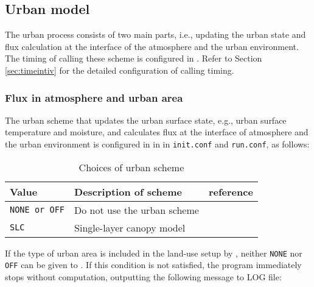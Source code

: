 \subsection{Urban model} \label{subsec:basic_usel_urban}
The urban process consists of two main parts, i.e., updating the urban state and flux calculation at the interface of the atmosphere and the urban environment. The timing of calling these scheme is configured in . Refer to Section \ref{sec:timeintiv} for the detailed configuration of calling timing.

\subsubsection{Flux in atmosphere and urban area}

The urban scheme that updates the urban surface state, e.g., urban surface temperature and moisture, and calculates flux at the interface of atmosphere and the urban environment is configured in  in  in \verb|init.conf| and \verb|run.conf|, as follows:

\begin{table}[hbt]
\begin{center}
  \caption{Choices of urban scheme}
  \label{tab:nml_urban}
  \begin{tabularx}{150mm}{llX} \hline
    \rowcolor[gray]{0.9}  Value  & Description of scheme & reference \\ \hline
      \verb|NONE or OFF|  & Do not use the urban scheme            \\
      \verb|SLC|          & Single-layer canopy model  & \citet{kusaka_2001} \\
    \hline
  \end{tabularx}
\end{center}
\end{table}

If the type of urban area is included in the land-use setup by , neither \verb|NONE| nor \verb|OFF| can be given to . If this condition is not satisfied, the program immediately stops without computation, outputting the following message to LOG file:
